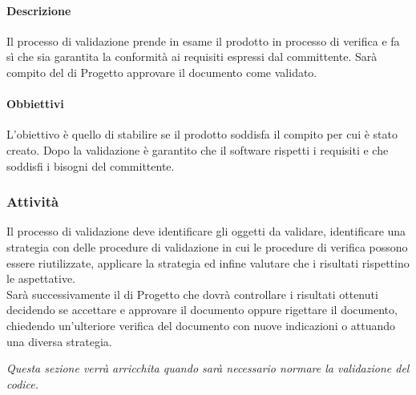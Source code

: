             \paragraph{Descrizione}
                Il processo di validazione prende in esame il prodotto in processo di verifica e fa sì che sia garantita la conformità ai requisiti espressi dal committente. Sarà compito del  di Progetto approvare il documento come validato.
            \paragraph{Obbiettivi}
                L’obiettivo è quello di stabilire se il prodotto soddisfa il compito per cui è stato creato. Dopo la validazione è garantito che il software rispetti i requisiti e che soddisfi i bisogni del committente.
        \subsubsection{Attività}
            Il processo di validazione deve identificare gli oggetti da validare, identificare una strategia con delle procedure di validazione in cui le procedure di verifica possono essere riutilizzate, applicare la strategia ed infine valutare che i risultati rispettino le aspettative.\\
            Sarà successivamente il  di Progetto che dovrà controllare i risultati ottenuti decidendo se accettare e approvare il documento oppure rigettare il documento, chiedendo un’ulteriore verifica del documento con nuove indicazioni o attuando una diversa strategia.\\
        \begin{center}
            \emph{Questa sezione verrà arricchita quando sarà necessario normare la validazione del codice.}
        \end{center}
\newpage
            
            
            
            
            